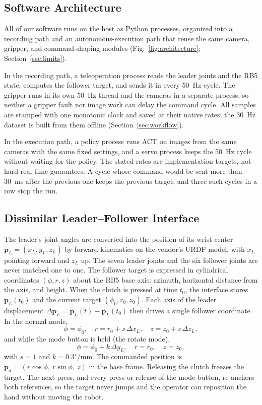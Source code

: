 \subsection{Software Architecture}
\label{sec:architecture}
All of our software runs on the host as Python processes, organized into a
recording path and an autonomous-execution path that reuse the same camera,
gripper, and command-shaping modules (Fig.~\ref{fig:architecture};
Section~\ref{sec:limits}).

In the recording path, a teleoperation process reads the leader joints and
the RB5 state, computes the follower target, and sends it in every 50~Hz
cycle. The gripper runs in its own 50~Hz thread and the cameras in a separate
process, so neither a gripper fault nor image work can delay the command
cycle. All samples are stamped with one monotonic clock and saved at their
native rates; the 30~Hz dataset is built from them offline
(Section~\ref{sec:workflow}).

In the execution path, a policy process runs ACT on images from the same
cameras with the same fixed settings, and a servo process keeps the 50~Hz
cycle without waiting for the policy. The stated rates are implementation
targets, not hard real-time guarantees. A cycle whose command would be sent
more than 30~ms after the previous one keeps the previous target, and three
such cycles in a row stop the run.

\subsection{Dissimilar Leader--Follower Interface}
\label{sec:interface}
The leader's joint angles are converted into the position of its wrist
center $\mathbf{p}_L=(x_L,y_L,z_L)$ by forward kinematics on the vendor's URDF
model, with $x_L$ pointing forward and $z_L$ up.
The seven leader joints and the six follower joints are never matched one to
one. The follower target is expressed in cylindrical coordinates
$(\phi, r, z)$ about the RB5 base axis: azimuth, horizontal distance from the
axis, and height. When the clutch is pressed at time $t_0$, the interface
stores $\mathbf{p}_L(t_0)$ and the current target $(\phi_0, r_0, z_0)$. Each
axis of the leader displacement $\Delta\mathbf{p}_L=\mathbf{p}_L(t)-\mathbf{p}_L(t_0)$
then drives a single follower coordinate. In the normal mode,
\begin{equation}
\phi = \phi_0,\quad r = r_0 + s\,\Delta x_L,\quad z = z_0 + s\,\Delta z_L,
\label{eq:normal}
\end{equation}
and while the mode button is held (the rotate mode),
\begin{equation}
\phi = \phi_0 + k\,\Delta y_L,\quad r = r_0,\quad z = z_0,
\label{eq:rotate}
\end{equation}
with $s=1$ and $k=0.3^\circ$/mm. The commanded position is
$\mathbf{p}_d=(r\cos\phi,\ r\sin\phi,\ z)$ in the base frame. Releasing the
clutch freezes the target. The next press, and every press or release of the
mode button, re-anchors both references, so the target never jumps and the
operator can reposition the hand without moving the robot.

